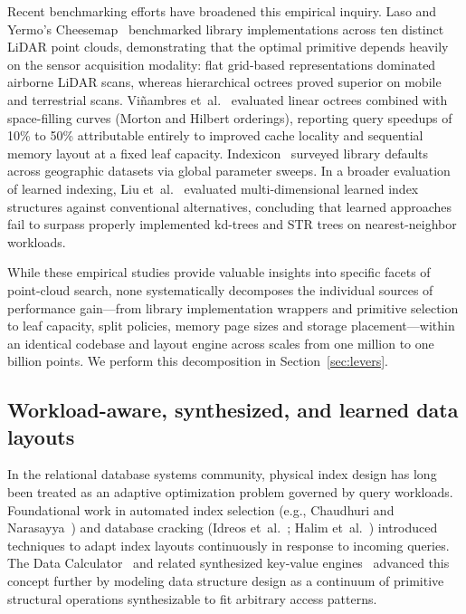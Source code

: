 Recent benchmarking efforts have broadened this empirical inquiry. Laso and Yermo's Cheesemap~\cite{laso2025cheesemap} benchmarked library implementations across ten distinct LiDAR point clouds, demonstrating that the optimal primitive depends heavily on the sensor acquisition modality: flat grid-based representations dominated airborne LiDAR scans, whereas hierarchical octrees proved superior on mobile and terrestrial scans. Vi\~nambres et~al.~\cite{vinambres2026linearoctrees} evaluated linear octrees combined with space-filling curves (Morton and Hilbert orderings), reporting query speedups of 10\% to 50\% attributable entirely to improved cache locality and sequential memory layout at a fixed leaf capacity. Indexicon~\cite{indexicon2026} surveyed library defaults across geographic datasets via global parameter sweeps. In a broader evaluation of learned indexing, Liu et~al.~\cite{liu2024learnedspatial} evaluated multi-dimensional learned index structures against conventional alternatives, concluding that learned approaches fail to surpass properly implemented kd-trees and STR trees on nearest-neighbor workloads.

While these empirical studies provide valuable insights into specific facets of point-cloud search, none systematically decomposes the individual sources of performance gain---from library implementation wrappers and primitive selection to leaf capacity, split policies, memory page sizes and storage placement---within an identical codebase and layout engine across scales from one million to one billion points. We perform this decomposition in Section~\ref{sec:levers}.

\subsection{Workload-aware, synthesized, and learned data layouts}

In the relational database systems community, physical index design has long been treated as an adaptive optimization problem governed by query workloads. Foundational work in automated index selection (e.g., Chaudhuri and Narasayya~\cite{chaudhuri1997indexselection}) and database cracking (Idreos et~al.~\cite{idreos2007databasecracking}; Halim et~al.~\cite{halim2012stochasticcracking}) introduced techniques to adapt index layouts continuously in response to incoming queries. The Data Calculator~\cite{idreos2018datacalculator} and related synthesized key-value engines~\cite{idreos2019learningkv} advanced this concept further by modeling data structure design as a continuum of primitive structural operations synthesizable to fit arbitrary access patterns.

